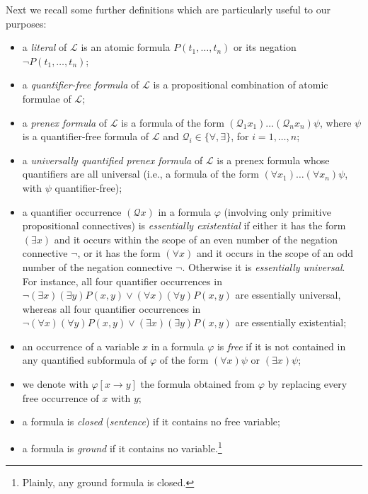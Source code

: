 \documentclass[a4paper]{llncs}
\newcommand{\Lang}{\ensuremath{\mathcal{L}\xspace}} %
\newcommand{\subst}[3]{#1[#2\rightarrow#3]}
\begin{document}
Next we recall some further definitions which are particularly useful 
to our purposes:
\begin{itemize}
\item a \emph{literal} of $\Lang$ is an atomic formula
   $P(t_1, \ldots, t_n)$ or its negation
   $\neg P(t_1, \ldots, t_n)$;

\item a \emph{quantifier-free formula} of $\Lang$ is a propositional 
combination of atomic formulae of $\Lang$;

\item a \emph{prenex formula} of $\Lang$ is a formula of the form
  $(\mathcal{Q}_1 x_1)\ldots(\mathcal{Q}_n x_n)\psi$, where $\psi$ is 
a quantifier-free formula of $\Lang$ and $\mathcal{Q}_i \in 
\{\forall,\exists\}$, for $i = 1,\ldots,n$;

\item a \emph{universally quantified prenex formula} of $\Lang$ is a 
prenex formula whose quantifiers are all universal (i.e., a formula 
of the form $(\forall x_1) \ldots (\forall x_n)\psi$, with $\psi$ 
quantifier-free);

\item a quantifier occurrence $(\mathcal{Q}x)$ in a formula $\varphi$ 
(involving only primitive propositional connectives) is 
\emph{essentially existential} if either it has the form $(\exists 
x)$ and it occurs within the scope of an even number of the negation 
connective $\neg$, or it has the form $(\forall x)$ and it occurs in 
the scope of an odd number of the negation connective $\neg$. 
Otherwise it is \emph{essentially universal}. For instance, all four 
quantifier occurrences in
$\neg (\exists x)(\exists y)P(x,y) \vee (\forall x)(\forall y)P(x,y)$ 
are essentially universal, whereas all four quantifier occurrences in 
$\neg (\forall x)(\forall y)P(x,y) \vee (\exists x)(\exists y)P(x,y)$ 
are essentially existential;

\item an occurrence of a variable $x$ in a formula $\varphi$ is 
\emph{free} if it is not contained in any quantified subformula of 
$\varphi$ of the form $(\forall x)\psi$ or $(\exists x)\psi$;

\item we denote with $\subst{\varphi}{x}{y}$ the formula obtained 
from $\varphi$ by replacing every free occurrence of $x$ with $y$;

\item a formula is \emph{closed} (\emph{sentence}) if it contains no 
free variable;

\item a formula is \emph{ground} if it contains no 
variable.\footnote{Plainly, any ground formula is closed.}

\end{itemize}
\end{document}
